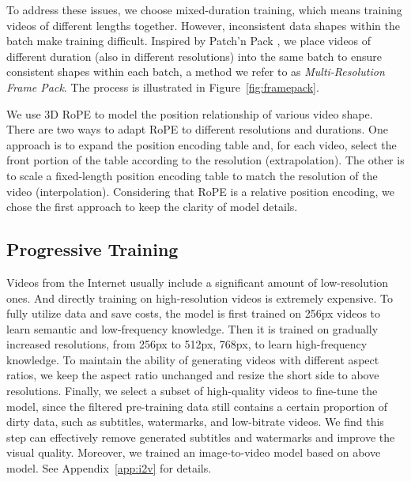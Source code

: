 To address these issues, we choose mixed-duration training, which means training videos of different lengths together. 
However, inconsistent data shapes within the batch make training difficult. 
Inspired by Patch'n Pack \citep{dehghani2024patch}, we place videos of different duration (also in different resolutions) into the same batch to ensure consistent shapes within each batch, a method we refer to as \textit{Multi-Resolution Frame Pack}. The process is illustrated in Figure~\ref{fig:framepack}. 

We use 3D RoPE to model the position relationship of various video shape. There are two ways to adapt RoPE to different resolutions and durations. One approach is to expand the position encoding table and, for each video, select the front portion of the table according to the resolution (extrapolation). The other is to scale a fixed-length position encoding table to match the resolution of the video (interpolation). Considering that RoPE is a relative position encoding, we chose the first approach to keep the clarity of model details.


\subsection{Progressive Training}
Videos from the Internet usually include a significant amount of low-resolution ones. And directly training on high-resolution videos is extremely expensive. To fully utilize data and save costs, the model is first trained on 256px videos to learn semantic and low-frequency knowledge. Then it is trained on gradually increased resolutions, from 256px to 512px, 768px, to learn high-frequency knowledge. To maintain the ability of generating videos with different aspect ratios, we keep the aspect ratio unchanged and resize the short side to above resolutions. Finally, we select a subset of high-quality videos to fine-tune the model, since the filtered pre-training data still contains a certain proportion of dirty data, such as subtitles, watermarks, and low-bitrate videos. We find this step can effectively remove generated subtitles and watermarks and improve the visual quality.
Moreover, we trained an image-to-video model based on above model. See Appendix~\ref{app:i2v} for details.
 

